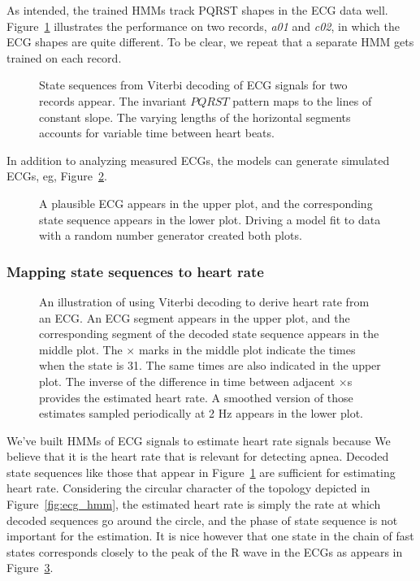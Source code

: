 As intended, the trained HMMs track PQRST shapes in the ECG data well.
Figure~\ref{fig:a01c02_states} illustrates the performance on two
records, \emph{a01} and \emph{c02}, in which the ECG shapes are quite
different.  To be clear, we repeat that a separate HMM gets trained on
each record.
\begin{figure}
  \caption[Decoded state sequences]{State sequences from Viterbi
    decoding of ECG signals for two records appear.  The invariant
    $PQRST$ pattern maps to the lines of constant slope.  The varying
    lengths of the horizontal segments accounts for variable time
    between heart beats.}
  \label{fig:a01c02_states}
\end{figure}

In addition to analyzing measured ECGs, the models can generate
simulated ECGs, eg, Figure~\ref{fig:simulated}.
\begin{figure}
  \caption[Simulated ECG]{A plausible ECG appears in the upper plot,
    and the corresponding state sequence appears in the lower plot.
    Driving a model fit to data with a random number generator created
  both plots.}
  \label{fig:simulated}
\end{figure}

\subsubsection{Mapping state sequences to heart rate}
\label{sec:states2hr}

\begin{figure}
  \caption[Heart rate derived from ECG.]{An illustration of using
    Viterbi decoding to derive heart rate from an ECG.  An ECG segment
    appears in the upper plot, and the corresponding segment of the
    decoded state sequence appears in the middle plot.  The $\times$
    marks in the middle plot indicate the times when the state is 31.
    The same times are also indicated in the upper plot.  The inverse
    of the difference in time between adjacent $\times$s provides the
    estimated heart rate.  A smoothed version of those estimates
    sampled periodically at 2 Hz appears in the lower plot. }
  \label{fig:ecg2hr}
\end{figure}

We've built HMMs of ECG signals to estimate heart rate signals because
We believe that it is the heart rate that is relevant for detecting
apnea.  Decoded state sequences like those that appear in
Figure~\ref{fig:a01c02_states} are sufficient for estimating heart
rate.  Considering the circular character of the topology depicted in
Figure~\ref{fig:ecg_hmm}, the estimated heart rate is simply the rate
at which decoded sequences go around the circle, and the phase of
state sequence is not important for the estimation.  It is nice
however that one state in the chain of fast states corresponds closely
to the peak of the R wave in the ECGs as appears in
Figure~\ref{fig:ecg2hr}.

